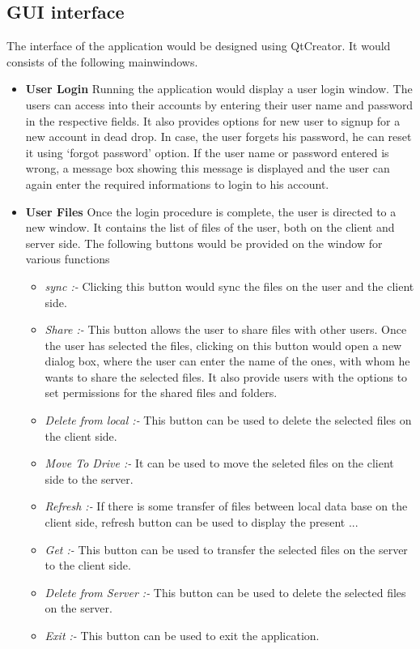 \documentclass{article}
\begin{document}
			\subsection{GUI interface} 
				The interface of the application would be designed using QtCreator. It would consists of the following mainwindows.
				\begin{itemize}
					\item \textbf{User Login}
						\newline
						Running the application would display a user login window. The users can access into their accounts by entering their user name and password in the respective fields. It also provides options for new user to signup for a new account in dead drop. In case, the user forgets his password, he can reset it using `forgot password' option. If the user name or password entered is wrong, a message box showing this message is displayed and the user can again enter the required informations to login to his account. 
					 
					\item \textbf{User Files}
						\newline
						Once the login procedure is complete, the user is directed to a new window. It contains the list of files of the user, both on the client and server side. The following buttons would be provided on the window for various functions
					\begin{itemize}
						\item \textit{sync :-} Clicking this button would sync the files on the user and the client side.
						\item \textit{Share :-} This button allows the user to share files with other users. Once the user has selected the files, clicking on this button would open a new dialog box, where the user can enter the name of the ones, with whom he wants to share the selected files. It also provide users with the options to set permissions for the shared files and folders.
						\item \textit{Delete from local :-} This button can be used to delete the selected files on the client side.
						\item \textit{Move To Drive :-} It can be used to move the seleted files on the client side to the server.
						\item \textit{Refresh :-} If there is some transfer of files between local data base on the client side, refresh button can be used to display the present ...
						\item \textit{Get :-} This button can be used to transfer the selected files on the server to the client side.
						\item \textit{Delete from Server :-} This button can be used to delete the selected files on the server.
						\item \textit{Exit :-} This button can be used to exit the application.
					\end{itemize} 
						

\end{itemize}
\end{document}
